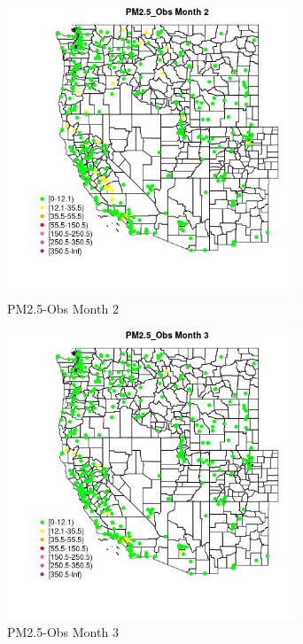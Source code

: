 \begin{figure} 
\centering  
\includegraphics[width=0.77\textwidth]{Code_Outputs/ML_input_report_ML_input_PM25_Step5_part_d_de_duplicated_aves_ML_input_MapObsMo2PM25_Obs.jpg} 
\caption{\label{fig:ML_input_report_ML_input_PM25_Step5_part_d_de_duplicated_aves_ML_inputMapObsMo2PM25_Obs}PM2.5-Obs Month 2} 
\end{figure} 
 

\begin{figure} 
\centering  
\includegraphics[width=0.77\textwidth]{Code_Outputs/ML_input_report_ML_input_PM25_Step5_part_d_de_duplicated_aves_ML_input_MapObsMo3PM25_Obs.jpg} 
\caption{\label{fig:ML_input_report_ML_input_PM25_Step5_part_d_de_duplicated_aves_ML_inputMapObsMo3PM25_Obs}PM2.5-Obs Month 3} 
\end{figure} 
 

